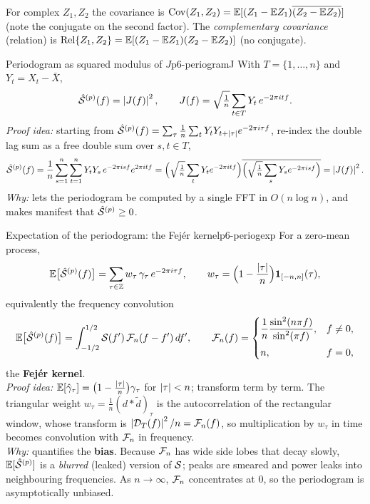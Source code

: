 \begin{recallbox}
For complex $Z_1,Z_2$ the covariance is
$\operatorname{Cov}(Z_1,Z_2)=\mathbb{E}[(Z_1-\mathbb{E} Z_1)\overline{(Z_2-\mathbb{E} Z_2)}]$ (note the conjugate on the
second factor). The \emph{complementary covariance} (relation) is
$\mathrm{Rel}\{Z_1,Z_2\}=\mathbb{E}[(Z_1-\mathbb{E} Z_1)(Z_2-\mathbb{E} Z_2)]$ (no conjugate).
\end{recallbox}

\begin{proposition}{Periodogram as squared modulus of $J$}{p6-periogramJ}
With $T=\{1,\dots,n\}$ and $Y_t=X_t-\bar X$,
\[
\hat{\mathcal{S}}^{(p)}(f)=\left\lvert J(f) \right\rvert^2,\qquad
J(f)=\sqrt{\tfrac1n}\sum_{t\in T} Y_t\,e^{-2\pi i t f}.
\]
\textit{Proof idea:} starting from
$\hat{\mathcal{S}}^{(p)}(f)=\sum_{\tau}\frac1n\sum_t Y_tY_{t+\left\lvert \tau \right\rvert}e^{-2\pi i\tau f}$,
re-index the double lag sum as a free double sum over $s,t\in T$,
\[
\hat{\mathcal{S}}^{(p)}(f)=\frac1n\sum_{s=1}^{n}\sum_{t=1}^{n}
Y_tY_s\,e^{-2\pi i s f}e^{2\pi i t f}
=\Big(\sqrt{\tfrac1n}\sum_t Y_t e^{-2\pi i t f}\Big)
\overline{\Big(\sqrt{\tfrac1n}\sum_s Y_s e^{-2\pi i s f}\Big)}
=\left\lvert J(f) \right\rvert^2 .
\]
\textit{Why:} lets the periodogram be computed by a single FFT in
$O(n\log n)$, and makes manifest that $\hat{\mathcal{S}}^{(p)}\ge0$.
\end{proposition}

\begin{theorem}{Expectation of the periodogram: the Fej\'er kernel}{p6-periogexp}
For a zero-mean process,
\[
\mathbb{E}\big[\hat{\mathcal{S}}^{(p)}(f)\big]
=\sum_{\tau\in\mathbb{Z}} w_\tau\,\gamma_\tau\,e^{-2\pi i\tau f},\qquad
w_\tau=\Big(1-\frac{\left\lvert \tau \right\rvert}{n}\Big)\mathbf{1}_{[-n,n]}(\tau),
\]
equivalently the frequency convolution
\[
\mathbb{E}\big[\hat{\mathcal{S}}^{(p)}(f)\big]=\int_{-1/2}^{1/2}\mathcal{S}(f')\,\mathcal{F}_n(f-f')\,df',
\qquad
\mathcal{F}_n(f)=
\begin{cases}
\dfrac1n\dfrac{\sin^2(n\pi f)}{\sin^2(\pi f)}, & f\ne0,\\[2.2ex]
n, & f=0,
\end{cases}
\]
the \textbf{Fej\'er kernel}.\\[2pt]
\textit{Proof idea:} $\mathbb{E}[\hat{\gamma}_\tau]=\big(1-\tfrac{\left\lvert \tau \right\rvert}{n}\big)\gamma_\tau$
for $\left\lvert \tau \right\rvert<n$; transform term by term. The triangular weight
$w_\tau=\tfrac1n(d*\tilde d)_\tau$ is the autocorrelation of the rectangular
window, whose transform is $\left\lvert \mathcal{D}_T(f) \right\rvert^2/n=\mathcal{F}_n(f)$, so multiplication by
$w_\tau$ in time becomes convolution with $\mathcal{F}_n$ in frequency.\\
\textit{Why:} quantifies the \textbf{bias}. Because $\mathcal{F}_n$ has wide side
lobes that decay slowly, $\mathbb{E}[\hat{\mathcal{S}}^{(p)}]$ is a \emph{blurred} (leaked)
version of $\mathcal{S}$; peaks are smeared and power leaks into neighbouring
frequencies. As $n\to\infty$, $\mathcal{F}_n$ concentrates at $0$, so the periodogram
is asymptotically unbiased.
\end{theorem}

